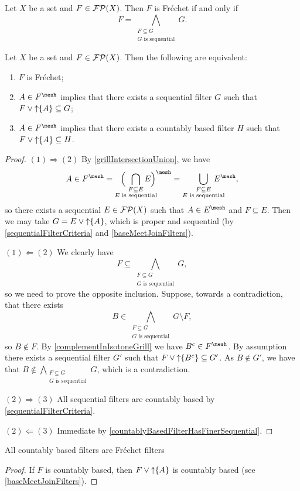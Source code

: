 \begin{lemma}
Let $X$ be a set and $F\in\operatorname{\mathcal{FP}}(X)$. Then $F$ is Fréchet \textup{if and only if}
\[ F = \bigwedge_{\substack{F\subseteq G \\ \text{$G$ is sequential}}} G. \]
\end{lemma}

\begin{proposition}
Let $X$ be a set and $F\in\operatorname{\mathcal{FP}}(X)$. Then the following are equivalent:
\begin{enumerate}
\item $F$ is Fréchet;
\item $A\in F^\mesh$ implies that there exists a sequential filter $G$ such that $F\vee \operatorname{\uparrow}\{A\} \subseteq G$;
\item $A\in F^\mesh$ implies that there exists a countably based filter $H$ such that $F\vee \operatorname{\uparrow}\{A\} \subseteq H$.
\end{enumerate}
\end{proposition}
\begin{proof}
$(1) \Rightarrow (2)$ By \ref{grillIntersectionUnion}, we have
\[ A\in F^\mesh = \hspace{0.7em} \Big( \hspace{-1.5em} \bigcap_{\substack{F\subseteq E \\ \text{$E$ is sequential}}} \hspace{-1.7em} E\Big)^\mesh = \bigcup_{\substack{F\subseteq E \\ \text{$E$ is sequential}}} \hspace{-1.5em} E^\mesh, \]
so there exists a sequential $E\in\operatorname{\mathcal{FP}}(X)$ such that $A\in E^\mesh$ and $F\subseteq E$. Then we may take $G = E\vee \operatorname{\uparrow}\{A\}$, which is proper and sequential (by \ref{sequentialFilterCriteria} and \ref{baseMeetJoinFilters}).

$(1) \Leftarrow (2)$ We clearly have
\[ F \subseteq \bigwedge_{\substack{F\subseteq G \\ \text{$G$ is sequential}}}G, \]
so we need to prove the opposite inclusion. Suppose, towards a contradiction, that there exists
\[ B \in \bigwedge_{\substack{F\subseteq G \\ \text{$G$ is sequential}}} G \setminus F, \]
so $B\notin F$. By \ref{complementInIsotoneGrill} we have $B^c\in F^\mesh$. By assumption there exists a sequential filter $G'$ such that $F\vee \operatorname{\uparrow}\{B^c\} \subseteq G'$. As $B\notin G'$, we have that $B\notin \bigwedge_{\substack{F\subseteq G \\ \text{$G$ is sequential}}} G$, which is a contradiction.

$(2) \Rightarrow (3)$ All sequential filters are countably based by \ref{sequentialFilterCriteria}.

$(2) \Leftarrow (3)$ Immediate by \ref{countablyBasedFilterHasFinerSequential}.
\end{proof}
\begin{corollary}
All countably based filters are Fréchet filters
\end{corollary}
\begin{proof}
If $F$ is countably based, then $F\vee \operatorname{\uparrow}\{A\}$ is countably based (see \ref{baseMeetJoinFilters}).
\end{proof}

